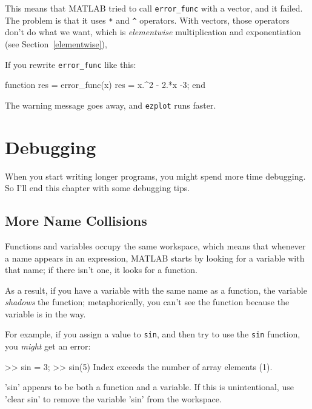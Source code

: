 This means that MATLAB tried to call \verb"error_func" with a vector, and it failed. 
The problem is that it uses \verb"*" and \verb"^" operators.  With vectors, those operators don't do what we want, which is {\em elementwise} multiplication and exponentiation
(see Section~\ref{elementwise}),


If you rewrite \verb"error_func" like this:

\begin{code}
function res = error_func(x)
    res = x.^2 - 2.*x -3;
end
\end{code}

The warning message goes away, and {\tt ezplot} runs faster.


\section{Debugging}

When you start writing longer programs, you might spend more time debugging.  So I'll end this chapter with some debugging tips.

\subsection{More Name Collisions}

Functions and variables occupy the same workspace, which means
that whenever a name appears in an expression, MATLAB starts by looking
for a variable with that name; if there isn't one, it looks for
a function.


As a result, if you have a variable with the same name as a function,
the variable {\em shadows} the function; metaphorically, you can't see the function because the variable is in the way.  

For example, if you assign
a value to {\tt sin}, and then try to use the {\tt sin} function, you
{\em might} get an error:

\begin{code}
>> sin = 3;
>> sin(5)
Index exceeds the number of array elements (1).

'sin' appears to be both a function and a variable.
If this is unintentional, use 'clear sin' to remove 
the variable 'sin' from the workspace.
\end{code}

